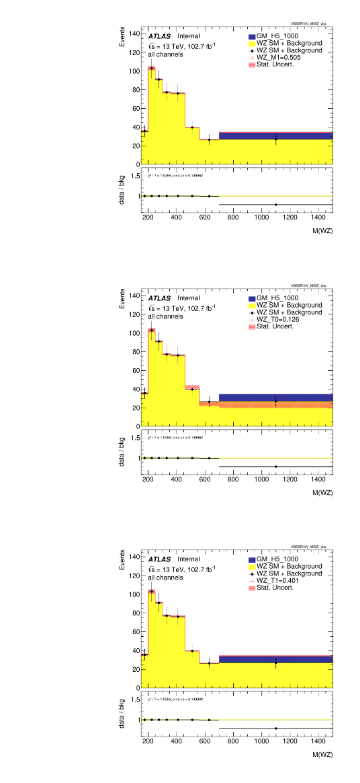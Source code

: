 \documentclass[../Bachelorarbeit.tex]{subfiles}
\begin{document}
\begin{figure}[h]
\begin{subfigure}{0.35\textwidth}
        \includegraphics[width=\textwidth]{Plots/ALL_MWZ_right_color/GM_H5_1000/M1/2022-05-07/VBSSR/all_VV_MWZ_vbs.pdf}
    \end{subfigure}
    \begin{subfigure}{0.35\textwidth}
        \includegraphics[width=\textwidth]{Plots/ALL_MWZ_right_color/GM_H5_1000/T0/2022-05-07/VBSSR/all_VV_MWZ_vbs.pdf}
    \end{subfigure}
    \begin{subfigure}{0.35\textwidth}
        \includegraphics[width=\textwidth]{Plots/1000_T1_MWZ/all_VV_MWZ_vbs.pdf}

\end{subfigure}
\end{figure}
\end{document}
